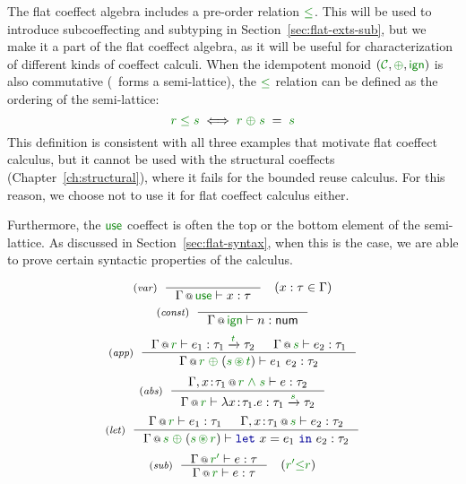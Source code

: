 The flat coeffect algebra includes a pre-order relation $\cleq$. This will be used to introduce
subcoeffecting and subtyping in Section~\ref{sec:flat-exts-sub}, but we make it a part of the flat
coeffect algebra, as it will be useful for characterization of different kinds of coeffect calculi.
When the idempotent monoid $(\C, \cpar, \czero)$ is also commutative (\ie~forms a
semi-lattice), the $\cleq$ relation can be defined as the ordering of the semi-lattice:
%
\begin{equation*}
\cclrd{r} \;\cleq\; \cclrd{s} \;\Longleftrightarrow\; \cclrd{r} \;\cpar\; \cclrd{s} \;=\; \cclrd{s}
\end{equation*}
%
This definition is consistent with all three examples that motivate flat coeffect calculus, but
it cannot be used with the structural coeffects (Chapter~\ref{ch:structural}), where it fails for
the bounded reuse calculus. For this reason, we choose not to use it for flat coeffect calculus
either.

Furthermore, the $\cunit$ coeffect is often the top or the bottom element of the semi-lattice.
As discussed in Section~\ref{sec:flat-syntax}, when this is the case, we are able to prove certain
syntactic properties of the calculus.


\begin{figure}[t]
\begin{equation*}
\tyrule{var}
  {~}
  {\coctx{\Gamma}{\cunit} \vdash x : \tau }\quad(x : \tau \in \Gamma)
\end{equation*}
\begin{equation*}
\tyrule{const}
  {~}
  {\coctx{\Gamma}{\czero} \vdash n : \ident{num} }
\end{equation*}
\begin{equation*}
\tyrule{app}
  {\coctx{\Gamma}{\cclrd{r}} \vdash e_1 : \tau_1 \xrightarrow{\cclrd{t}} \tau_2 &
   \coctx{\Gamma}{\cclrd{s}} \vdash e_2 : \tau_1 }
  {\coctx{\Gamma}{\cclrd{r} \;\cpar\; (\cclrd{s} \,\cseq\, \cclrd{t})} \vdash e_1~e_2 : \tau_2}
\end{equation*}
\begin{equation*}
\tyrule{abs}
  {\coctx{\Gamma, x\!:\!\tau_1}{\cclrd{r}\;\czip\;\cclrd{s}} \vdash e : \tau_2}
  {\coctx{\Gamma}{\cclrd{r}} \vdash \lambda x\!:\!\tau_1.e : \tau_1 \xrightarrow{\cclrd{s}} \tau_2 }
\end{equation*}
\begin{equation*}
\tyrule{let}
  { \coctx{\Gamma}{\cclrd{r}} \vdash e_1 : \tau_1 &
    \coctx{\Gamma, x\!:\!\tau_1}{\cclrd{s}} \vdash e_2 : \tau_2}
  {\coctx{\Gamma}{\cclrd{s} \;\cpar\; (\cclrd{s} \,\cseq\, \cclrd{r})} \vdash \kvd{let}~x=e_1~\kvd{in}~e_2 : \tau_2 }
\end{equation*}
%
\begin{equation*}
\tyrule{sub}
  {\coctx{\Gamma}{\cclrd{r'}} \vdash e : \tau }
  {\coctx{\Gamma}{\cclrd{r}} \vdash e : \tau }\quad(\cclrd{r'} \cleq \cclrd{r})
\end{equation*}
%

\label{fig:flat-types}
\end{figure}

